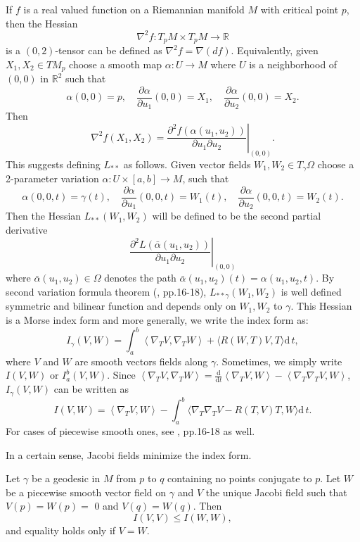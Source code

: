 \documentclass{ctexart}
\begin{document}
If $f$ is a real valued function on a Riemannian manifold $M$ with critical point $p$, then the Hessian
$$
\nabla^2 f: T_p M \times T_p M \rightarrow \mathbb{R}
$$
is a $(0,2)$-tensor can be defined as $\nabla^2 f=\nabla(df)$. Equivalently, given $X_1, X_2 \in T M_p$ choose a smooth map
$\alpha: U\rightarrow M$ where $U$ is a neighborhood of $(0,0)$ in $\mathbb{R}^2$ such that 
$$
\alpha(0,0)=p,\quad \frac{\partial \alpha}{\partial u_1}(0,0)=X_1,\quad \frac{\partial \alpha}{\partial u_2}(0,0)=X_2 .
$$
Then
$$
\nabla^2 f\left(X_1, X_2\right)=\left.\frac{\partial^2 f\left(\alpha\left(u_1, u_2\right)\right)}{\partial u_1 \partial u_2}\right|_{(0,0)}.
$$
This suggests defining $L_{* *}$ as follows. Given vector fields $W_1, W_2 \in T_\gamma\Omega$ choose a 2-parameter variation
$\alpha: U \times[a,b] \rightarrow M$, such that
$$
\alpha(0,0, t)=\gamma(t), \quad \frac{\partial \alpha}{\partial u_1}(0,0, t)=W_1(t), \quad \frac{\partial \alpha}{\partial u_2}(0,0, t)=W_2(t) .
$$
Then the Hessian $L_{* *}\left(W_1, W_2\right)$ will be defined to be the second partial derivative
$$
\left.\frac{\partial^2 L\left(\bar{\alpha}\left(u_1, u_2\right)\right)}{\partial u_1 \partial u_2}\right|_{(0,0)}
$$
where $\bar{\alpha}\left(u_1, u_2\right) \in \Omega$ denotes the path $\bar{\alpha}\left(u_1, u_2\right)(t)=\alpha\left(u_1, u_2, t\right)$. 
By second variation formula theorem (\cite{Cheeger2008}, pp.16-18), $L_{* * \gamma}(W_1,W_2)$ is well defined symmetric and bilinear function and depends only on $W_1,W_2$ to $\gamma$. 
This Hessian is a Morse index form and more generally, we write the index form as: 
$$
I_\gamma(V, W)=\int_a^b\left\langle\nabla_T V, \nabla_T W\right\rangle+\langle R(W, T) V, T\rangle\mathrm{d}\,t,
$$
where $V$ and $W$ are smooth vectors fields along $\gamma$. Sometimes, we simply write $I(V,W)$ or $I_a^b(V,W)$.
Since $\left\langle\nabla_T V, \nabla_T W\right\rangle=\frac{\mathrm{d}}{\mathrm{d}t}\left\langle\nabla_T V, W\right\rangle-\left\langle\nabla_T \nabla_T V,  W\right\rangle$, 
$I_\gamma(V, W)$ can be written as 
$$
I(V, W)=\left\langle\nabla_T V, W\right\rangle-\int_a^b\langle \nabla_T \nabla_T V - R(T, V) T, W\rangle\mathrm{d}\,t. 
$$
For cases of piecewise smooth ones, see \cite{Cheeger2008}, pp.16-18 as well.

In a certain sense, Jacobi fields minimize the index form. 
\begin{lemma}
  Let $\gamma$ be a geodesic in $M$ from $p$ to $q$ containing no points conjugate to $p$. Let $W$ be a piecewise smooth vector field on $\gamma$ 
  and $V$ the unique Jacobi field such that $V(p)=W(p)=$ 0 and $V(q)=W(q)$. Then 
  $$
  I(V, V) \leq I(W, W), 
  $$
  and equality holds only if $V=W$.
\end{lemma}
\end{document}
